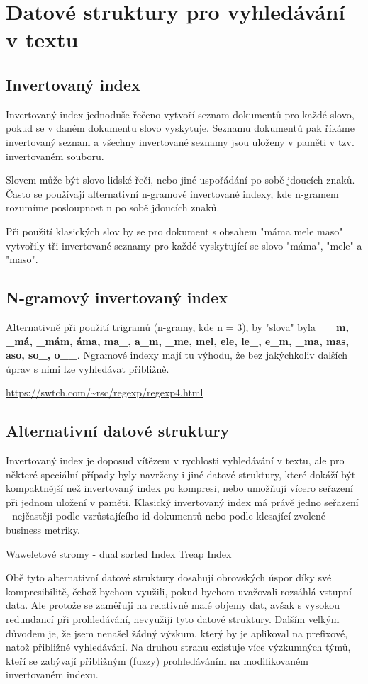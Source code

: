 \documentclass[11pt]{article}
\begin{document}
\section{Datové struktury pro vyhledávání v textu}
\subsection{Invertovaný index}
Invertovaný index jednoduše řečeno vytvoří seznam dokumentů pro každé slovo,
pokud se v daném dokumentu slovo vyskytuje. Seznamu dokumentů pak říkáme
invertovaný seznam a všechny invertované seznamy jsou uloženy v paměti v tzv.
invertovaném souboru.

Slovem může být slovo lidské řeči, nebo jiné uspořádání po sobě jdoucích znaků.
Často se používají alternativní n-gramové invertované indexy, kde n-gramem
rozumíme posloupnost n po sobě jdoucích znaků.

Při použití klasických slov by se pro dokument s obsahem "máma mele maso"
vytvořily tři invertované seznamy pro každé vyskytující se slovo "máma", "mele"
a "maso".

\subsection{N-gramový invertovaný index}
Alternativně při použití trigramů (n-gramy, kde n = 3), by "slova" byla
\textbf{\_\_m, \_má, \_mám, áma, ma\_, a\_m, \_me, mel, ele, le\_, e\_m, \_ma,
mas, aso, so\_, o\_\_}. Ngramové indexy mají tu výhodu, že bez jakýchkoliv
dalších úprav s nimi lze vyhledávat přibližně. 

\url{https://swtch.com/~rsc/regexp/regexp4.html}




\subsection{Alternativní datové struktury}
Invertovaný index je doposud vítězem v rychlosti vyhledávání v textu, ale pro
některé speciální případy byly navrženy i jiné datové struktury, které dokáží
být kompaktnější než invertovaný index po kompresi, nebo umožňují vícero
seřazení při jednom uložení v paměti. Klasický invertovaný index má právě jedno
seřazení - nejčastěji podle vzrůstajícího id dokumentů nebo podle klesající
zvolené business metriky.

Waweletové stromy - dual sorted Index
Treap Index

Obě tyto alternativní datové struktury dosahují obrovských úspor díky své
kompresibilitě, čehož bychom využili, pokud bychom uvažovali rozsáhlá vstupní
data. Ale protože se zaměřuji na relativně malé objemy dat, avšak s vysokou
redundancí při prohledávání, nevyužiji tyto datové struktury. Dalším velkým
důvodem je, že jsem nenašel žádný výzkum, který by je aplikoval na prefixové,
natož přibližné vyhledávání. Na druhou stranu existuje více výzkumných týmů,
kteří se zabývají přibližným (fuzzy) prohledáváním na modifikovaném invertovaném
indexu.
\end{document}

